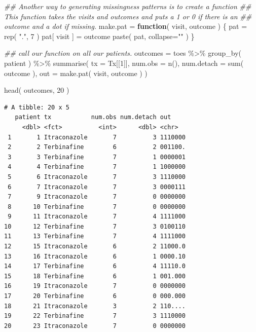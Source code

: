 \documentclass[
  letterpaper,
  DIV=11,
  numbers=noendperiod]{scrreprt}
\newenvironment{Shaded}{}{}
\newcommand{\AttributeTok}[1]{\textcolor[rgb]{0.49,0.56,0.16}{#1}}
\newcommand{\ControlFlowTok}[1]{\textcolor[rgb]{0.00,0.44,0.13}{\textbf{#1}}}
\newcommand{\DecValTok}[1]{\textcolor[rgb]{0.25,0.63,0.44}{#1}}
\newcommand{\DocumentationTok}[1]{\textcolor[rgb]{0.73,0.13,0.13}{\textit{#1}}}
\newcommand{\FunctionTok}[1]{\textcolor[rgb]{0.02,0.16,0.49}{#1}}
\newcommand{\NormalTok}[1]{#1}
\newcommand{\OtherTok}[1]{\textcolor[rgb]{0.00,0.44,0.13}{#1}}
\newcommand{\SpecialCharTok}[1]{\textcolor[rgb]{0.25,0.44,0.63}{#1}}
\newcommand{\StringTok}[1]{\textcolor[rgb]{0.25,0.44,0.63}{#1}}
\begin{document}
\begin{Shaded}
\begin{Highlighting}[]
\DocumentationTok{\#\# Another way to generating missingness patterns is to create a function}
\DocumentationTok{\#\# This function takes the visits and outcomes and puts a 1 or 0 if there is an}
\DocumentationTok{\#\# outcome and a dot if missing.}
\NormalTok{make.pat }\OtherTok{=} \ControlFlowTok{function}\NormalTok{( visit, outcome ) \{}
\NormalTok{    pat }\OtherTok{=} \FunctionTok{rep}\NormalTok{( }\StringTok{"."}\NormalTok{, }\DecValTok{7}\NormalTok{ )}
\NormalTok{    pat[ visit ] }\OtherTok{=}\NormalTok{ outcome}
    \FunctionTok{paste}\NormalTok{( pat, }\AttributeTok{collapse=}\StringTok{""}\NormalTok{ )}
\NormalTok{\}}

\DocumentationTok{\#\# call our function on all our patients.}
\NormalTok{outcomes }\OtherTok{=}\NormalTok{ toes }\SpecialCharTok{\%\textgreater{}\%} \FunctionTok{group\_by}\NormalTok{( patient ) }\SpecialCharTok{\%\textgreater{}\%}
    \FunctionTok{summarise}\NormalTok{( }\AttributeTok{tx =}\NormalTok{ Tx[[}\DecValTok{1}\NormalTok{]],}
               \AttributeTok{num.obs =} \FunctionTok{n}\NormalTok{(),}
               \AttributeTok{num.detach =} \FunctionTok{sum}\NormalTok{( outcome ),}
               \AttributeTok{out =} \FunctionTok{make.pat}\NormalTok{( visit, outcome ) )}

\FunctionTok{head}\NormalTok{( outcomes, }\DecValTok{20}\NormalTok{ )}
\end{Highlighting}
\end{Shaded}

\begin{verbatim}
# A tibble: 20 x 5
   patient tx           num.obs num.detach out    
     <dbl> <fct>          <int>      <dbl> <chr>  
 1       1 Itraconazole       7          3 1110000
 2       2 Terbinafine        6          2 001100.
 3       3 Terbinafine        7          1 0000001
 4       4 Terbinafine        7          1 1000000
 5       6 Itraconazole       7          3 1110000
 6       7 Itraconazole       7          3 0000111
 7       9 Itraconazole       7          0 0000000
 8      10 Terbinafine        7          0 0000000
 9      11 Itraconazole       7          4 1111000
10      12 Terbinafine        7          3 0100110
11      13 Terbinafine        7          4 1111000
12      15 Itraconazole       6          2 11000.0
13      16 Itraconazole       6          1 0000.10
14      17 Terbinafine        6          4 11110.0
15      18 Terbinafine        6          1 001.000
16      19 Itraconazole       7          0 0000000
17      20 Terbinafine        6          0 000.000
18      21 Itraconazole       3          2 110....
19      22 Terbinafine        7          3 1110000
20      23 Itraconazole       7          0 0000000
\end{verbatim}
\end{document}
